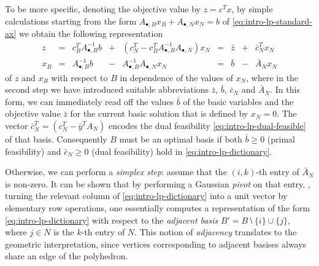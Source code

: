 To be more specific, denoting the objective value by $z=c^Tx$, by simple calculations starting from the form $A_{•,B} x_B + A_{•,N} x_N = b$ of \cref{eq:intro-lp-standard-ax} we obtain the following representation
\begin{equation}
  \begin{array}{ccrcrcccr}
   z   & = & c_B^T A_{•,B}^{-1} b & + & (c_N^T - c_B^T A_{•,B}^{-1} A_{•,N}) x_N 
       & = & \bar z & + & \bar c_N^T x_N\\
   x_B & = &       A_{•,B}^{-1} b & - &                A_{•,B}^{-1} A_{•,N}  x_N
       & = & \bar b & - & \bar A_N x_N
  \end{array}\label{eq:intro-lp-dictionary}
\end{equation}
of $z$ and $x_B$ with respect to $B$ in dependence of the values of $x_N$, where in the second step we have introduced suitable abbreviations $\bar z$, $\bar b$, $\bar c_N$ and $\bar A_N$. In this form, we can immediately read off the values $\bar b$ of the basic variables and the objective value $\bar z$ for the current basic solution that is defined by $x_N=0$. The vector $\bar c_N^T = (c_N^T - \bar y^T A_N)$ encodes the dual feasibility \cref{eq:intro-lp-dual-feasible} of that basis. Consequently $B$ must be an optimal basis if both $\bar b ≥ 0$ (primal feasibility) and $\bar c_N ≥ 0$ (dual feasibility) hold in \cref{eq:intro-lp-dictionary}.

Otherwise, we can perform a \emph{simplex step}: assume that the $(i,k)$-th entry of $\bar A_N$ is non-zero. It can be shown that by performing a Gaussian \emph{pivot} on that entry, \ie, turning the relevant column of \cref{eq:intro-lp-dictionary} into a unit vector by elementary row operations, one essentially computes a representation of the form \cref{eq:intro-lp-dictionary} with respect to the \emph{adjacent basis} $B' = B ⧵ \{i\} ∪ \{j\}$, where $j ∈ N$ is the $k$-th entry of $N$. This notion of \emph{adjacency} translates to the geometric interpretation, since vertices corresponding to adjacent basises always share an edge of the polyhedron.

